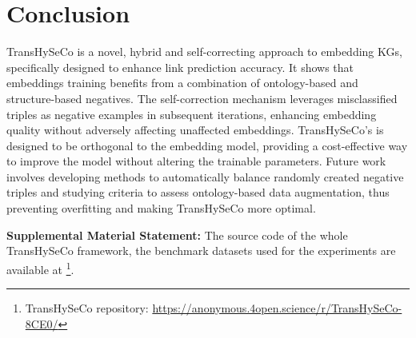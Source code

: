\documentclass[sigconf]{acmart}
\newcommand{\TransHI}{TransHySeCo\xspace}
\begin{document}
\section{Conclusion}
\label{sect:conclusion}
\TransHI is a novel, hybrid and self-correcting approach to embedding KGs, specifically designed to enhance link prediction accuracy. %
It shows that embeddings training benefits from a combination of ontology-based and structure-based negatives. %
The self-correction mechanism leverages misclassified triples as negative examples in subsequent iterations, enhancing embedding quality without adversely affecting unaffected embeddings. 
\TransHI's is designed to be orthogonal to the embedding model, providing a cost-effective way to improve the model without altering the trainable parameters.
Future work involves developing methods to automatically balance randomly created negative triples and studying criteria to assess ontology-based data augmentation, thus preventing overfitting and making \TransHI more optimal. %

\noindent \textbf{Supplemental Material Statement:} The source code of the whole \TransHI framework, the benchmark datasets used for the  experiments are available at  \footnote{\TransHI repository: \href{https://anonymous.4open.science/r/TransHySeCo-8CE0/}{https://anonymous.4open.science/r/TransHySeCo-8CE0/}\label{Link_Github}}. 

%
%

%

\end{document}
